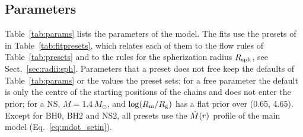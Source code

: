 \subsection{Parameters}
\label{sec:model:params}

Table~\ref{tab:params} lists the parameters of the model.
The fits use the presets of  in Table~\ref{tab:fitpresets}, which relates each of them to the flow rules of Table~\ref{tab:presets} and to the rules for the  spherization radius $R_{\rm sph}$, see Sect.~\ref{sec:radii:sph}.
Parameters that a preset does not free keep the defaults of Table~\ref{tab:params} or the values the preset sets; for a free parameter the default is only the centre of the starting positions of the chains and does not enter the prior; for a NS, $M = 1.4\,M_\odot$, and $\log(R_{\rm m}/R_{\rm g})$ has a flat prior over (0.65, 4.65).
Except for BH0, BH2 and NS2, all presets use the $\dot M(r)$ profile of the main model (Eq.~\ref{eq:mdot_setin}).

